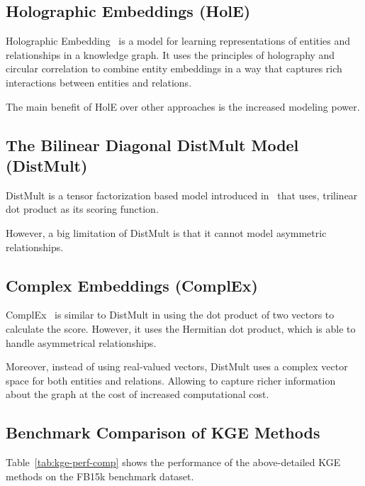 \FloatBarrier


\subsection{Holographic Embeddings (HolE)}

Holographic Embedding~\cite{HolE} is a model for learning representations of entities and relationships in a knowledge graph.
It uses the principles of holography and circular correlation to combine entity embeddings in a way that captures rich
interactions between entities and relations.

The main benefit of HolE over other approaches is the increased modeling power.

\subsection{The Bilinear Diagonal DistMult Model (DistMult)}

DistMult is a tensor factorization based model introduced in~\cite{DistMult} that uses,
trilinear dot product as its scoring function.

However, a big limitation of DistMult is that it cannot model asymmetric relationships.

\subsection{Complex Embeddings (ComplEx)}

ComplEx~\cite{ComplEx} is similar to DistMult in using the dot product of two vectors to calculate the score.
However, it uses the Hermitian dot product, which is able to handle asymmetrical relationships.

Moreover, instead of using real-valued vectors, DistMult uses a complex vector space for both entities and relations.
Allowing to capture richer information about the graph at the cost of increased computational cost.

\subsection{Benchmark Comparison of KGE Methods}
Table~\ref{tab:kge-perf-comp} shows the performance of the above-detailed KGE methods on the FB15k benchmark dataset.


